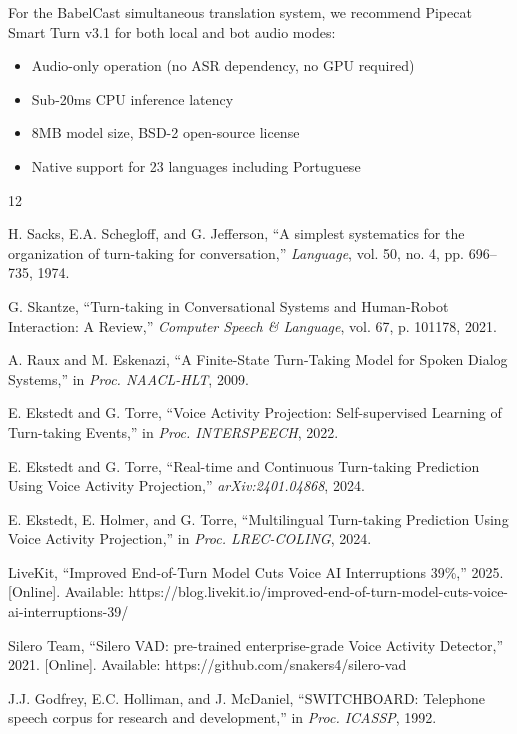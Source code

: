 \documentclass[conference]{IEEEtran}
\begin{document}
For the BabelCast simultaneous translation system, we recommend Pipecat Smart
Turn v3.1 for both local and bot audio modes:
\begin{itemize}
    \item Audio-only operation (no ASR dependency, no GPU required)
    \item Sub-20ms CPU inference latency
    \item 8MB model size, BSD-2 open-source license
    \item Native support for 23 languages including Portuguese
\end{itemize}


\begin{thebibliography}{12}

H. Sacks, E.A. Schegloff, and G. Jefferson,
``A simplest systematics for the organization of turn-taking for conversation,''
\textit{Language}, vol. 50, no. 4, pp. 696--735, 1974.

G. Skantze,
``Turn-taking in Conversational Systems and Human-Robot Interaction: A Review,''
\textit{Computer Speech \& Language}, vol. 67, p. 101178, 2021.

A. Raux and M. Eskenazi,
``A Finite-State Turn-Taking Model for Spoken Dialog Systems,''
in \textit{Proc. NAACL-HLT}, 2009.

E. Ekstedt and G. Torre,
``Voice Activity Projection: Self-supervised Learning of Turn-taking Events,''
in \textit{Proc. INTERSPEECH}, 2022.

E. Ekstedt and G. Torre,
``Real-time and Continuous Turn-taking Prediction Using Voice Activity Projection,''
\textit{arXiv:2401.04868}, 2024.

E. Ekstedt, E. Holmer, and G. Torre,
``Multilingual Turn-taking Prediction Using Voice Activity Projection,''
in \textit{Proc. LREC-COLING}, 2024.

LiveKit,
``Improved End-of-Turn Model Cuts Voice AI Interruptions 39\%,''
2025. [Online]. Available: https://blog.livekit.io/improved-end-of-turn-model-cuts-voice-ai-interruptions-39/

Silero Team,
``Silero VAD: pre-trained enterprise-grade Voice Activity Detector,''
2021. [Online]. Available: https://github.com/snakers4/silero-vad

J.J. Godfrey, E.C. Holliman, and J. McDaniel,
``SWITCHBOARD: Telephone speech corpus for research and development,''
in \textit{Proc. ICASSP}, 1992.


\end{thebibliography}
\end{document}
